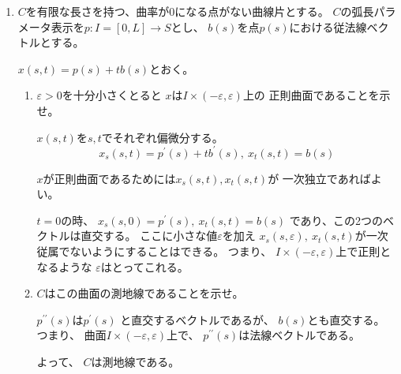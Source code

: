 \documentclass[12pt,b5paper]{ltjsarticle}
\begin{document}
\begin{enumerate}
      \dotfill

      \hrulefill

 \item
      $C$を有限な長さを持つ、曲率が$0$になる点がない曲線片とする。
      $C$の弧長パラメータ表示を$p:I=[0,L]\to S$とし、
      $b(s)$を点$p(s)$における従法線ベクトルとする。

      $x(s,t)=p(s)+tb(s)$とおく。

      \begin{enumerate}
       \item
            $\varepsilon>0$を十分小さくとると
            $x$は$I\times (-\varepsilon,\varepsilon)$上の
            正則曲面であることを示せ。

            \dotfill

            $x(s,t)$を$s,t$でそれぞれ偏微分する。
            \begin{equation}
             x_{s}(s,t)=p^{\prime}(s)+tb^{\prime}(s)
              ,\
             x_{t}(s,t)=b(s)
            \end{equation}

            $x$が正則曲面であるためには$x_{s}(s,t),x_{t}(s,t)$が
            一次独立であればよい。


            $t=0$の時、
            $x_{s}(s,0)=p^{\prime}(s),\ x_{t}(s,t)=b(s)$
            であり、この2つのベクトルは直交する。
            ここに小さな値$\varepsilon$を加え
            $x_{s}(s,\varepsilon),\ x_{t}(s,t)$が一次従属でないようにすることはできる。
            つまり、
            $I\times (-\varepsilon,\varepsilon)$上で正則となるような
            $\varepsilon$はとってこれる。

            \hrulefill

       \item
            $C$はこの曲面の測地線であることを示せ。

            \dotfill

            $p^{\prime\prime}(s)$は$p^{\prime}(s)$
            と直交するベクトルであるが、
            $b(s)$とも直交する。
            つまり、
            曲面$I\times (-\varepsilon,\varepsilon)$上で、
            $p^{\prime\prime}(s)$は法線ベクトルである。

            よって、
            $C$は測地線である。

            \hrulefill

      \end{enumerate}
\end{enumerate}


\hrulefill
\end{document}
